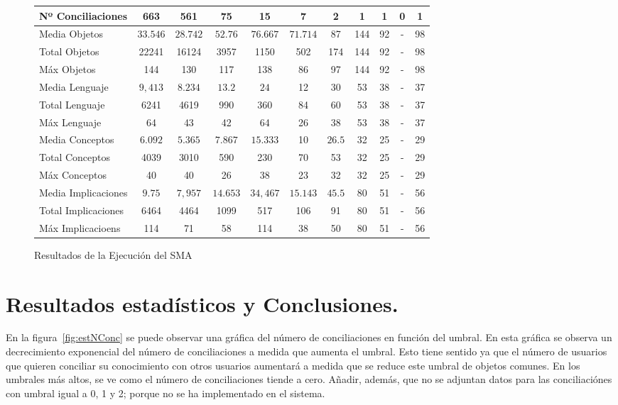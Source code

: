\begin{figure}
{\begin{tabular}{|l|c|c|c|c|c|c|c|c|c|c|}
Nº Conciliaciones & 663 		& 561 	& 75 		& 15 		& 7 		& 2 		& 1 		& 1 & 0 &  1   \\ \hline
Media Objetos 	& $33.546$ 	& $28.742$ & $52.76$ & $76.667$ & $71.714$ & 87 	& 144 	& 92 & - &  98   \\ \hline
Total Objetos & 22241 		& 16124 	& 3957 	& 1150 	& 502 	& 174 	& 144 	& 92 &-  &  98 \\ \hline
Máx Objetos & 144 			& 130 	& 117 	& 138 	& 86 		& 97 		& 144 	& 92 & - &  98   \\ \hline
Media Lenguaje & $9,413$ 		& $8.234$ 	& $13.2$ 	& $24$ 	& 12 		& 30 		& 53 		& 38 & - &  37   \\ \hline
Total Lenguaje & 6241 		& 4619	& 990	& 360	& 84 		& 60 		& 53 		& 38 & - &  37   \\ \hline
Máx Lenguaje & 64 			& 43 		& 42 		& 64 		& 26 		& 38 		& 53 		& 38 & - &  37   \\ \hline
Media Conceptos & $6.092$ & $5.365$ 	& $7.867$ 	& $15.333$ & 10 	& $26.5$ 	& 32 		& 25 & - &  29   \\ \hline
Total Conceptos & 4039 	& 3010 	& 590 	& 230 	& 70 		& 53 		& 32 		& 25 & - &  29   \\ \hline
Máx Conceptos & 40 		& 40 		& 26 		& 38 		& 23 		& 32 		& 32 		& 25 & - &  29   \\ \hline
Media Implicaciones & $9.75$ & $7,957$ & $14.653$ & $34,467$ & $15.143$ & $45.5$ & 80 	& 51 & - &  56   \\ \hline
Total Implicaciones & 6464 	& 4464 	& 1099 	& 517 	& 106 	& 91 		& 80 		& 51 & - &  56   \\ \hline
Máx Implicacioens & 114 	& 71 		& 58 		& 114 	& 38 		& 50 		& 80 		& 51 & - &  56   \\ \hline
\end{tabular}
}
\caption{Resultados de la Ejecución del SMA
\label{fig:resultados}
}

\end{figure} 






\section{Resultados estadísticos y Conclusiones.}

En la figura~\ref{fig:estNConc} se puede observar una gráfica del número de conciliaciones en función del umbral. En esta gráfica se observa un decrecimiento exponencial del número de conciliaciones a medida que aumenta el umbral. Esto tiene sentido ya que el número de usuarios que quieren conciliar su conocimiento con otros usuarios aumentará a medida que se reduce este umbral de objetos comunes. En los umbrales más altos, se ve como el número de conciliaciones tiende a cero. Añadir, además, que no se adjuntan datos para las conciliaciónes con umbral igual a 0, 1 y 2; porque no se ha implementado en el sistema.

